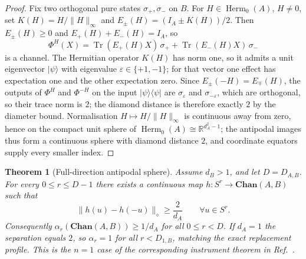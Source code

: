 \documentclass[11pt,a4paper]{article}
\theoremstyle{definition}
\theoremstyle{plain}
\newtheorem{theorem}{Theorem}[section]
\theoremstyle{remark}
\DeclareMathOperator{\Tr}{Tr}
\DeclareMathOperator{\Herm}{Herm}
\newcommand{\Chan}{\mathbf{Chan}}
\begin{document}
\begin{proof}
Fix two orthogonal pure states $\sigma_+,\sigma_-$ on $B$. For
$H\in\Herm_0(A)$, $H\neq0$, set $K(H)=H/\|H\|_\infty$ and
$E_\pm(H)=(I_A\pm K(H))/2$. Then $E_\pm(H)\ge0$ and
$E_+(H)+E_-(H)=I_A$, so
\[
\Phi^H(X)=\Tr(E_+(H)X)\,\sigma_++\Tr(E_-(H)X)\,\sigma_-
\]
is a channel. The Hermitian operator $K(H)$ has norm one, so it admits a unit
eigenvector $|\psi\rangle$ with eigenvalue $\varepsilon\in\{+1,-1\}$; for
that vector one effect has expectation one and the other expectation
zero. Since
$E_\pm(-H)=E_\mp(H)$, the outputs of $\Phi^H$ and $\Phi^{-H}$ on the input
$|\psi\rangle\langle\psi|$ are $\sigma_\varepsilon$ and
$\sigma_{-\varepsilon}$, which are orthogonal, so their trace norm is
$2$; the diamond distance is therefore exactly $2$ by the diameter bound.
Normalisation $H\mapsto H/\|H\|_\infty$ is continuous away from zero,
hence on the compact unit sphere of $\Herm_0(A)\cong\mathbb R^{d_A^2-1}$;
the antipodal images thus form a continuous sphere with diamond distance
$2$, and coordinate equators supply every smaller index.
\end{proof}

\begin{theorem}[Full-direction antipodal sphere]
\label{thm:full-direction-channel}
Assume $d_B>1$, and let $D=D_{A,B}$. For every $0\le r\le D-1$ there
exists a continuous map $h:S^r\to\Chan(A,B)$ such that
\[
\|h(u)-h(-u)\|_\diamond\ge\frac2{d_A}
\qquad\forall u\in S^r.
\]
Consequently $\alpha_r(\Chan(A,B))\ge1/d_A$ for all $0\le r<D$. If
$d_A=1$ the separation equals $2$, so $\alpha_r=1$ for all $r<D_{1,B}$,
matching the exact replacement profile. This is the $n=1$ case of
the corresponding instrument theorem in Ref.~\cite{CompanionInstruments}.
\end{theorem}
\end{document}

